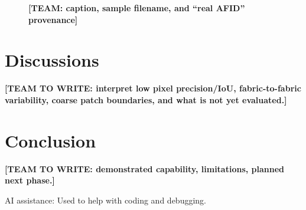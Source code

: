 \documentclass[conference]{IEEEtran}
\newcommand{\teamtowrite}[1]{\textbf{[TEAM TO WRITE: #1]}}
\begin{document}
\begin{figure}[!t]
\centering
{}
\caption{\textbf{[TEAM: caption, sample filename, and ``real AFID'' provenance]}}
\label{fig:example}
\end{figure}

\section{Discussions}
\teamtowrite{interpret low pixel precision/IoU, fabric-to-fabric variability, coarse patch boundaries, and what is not yet evaluated.}

\section{Conclusion}
\teamtowrite{demonstrated capability, limitations, planned next phase.}

\vspace{0.3em}
{\footnotesize AI assistance: Used to help with coding and debugging.}



\end{document}
